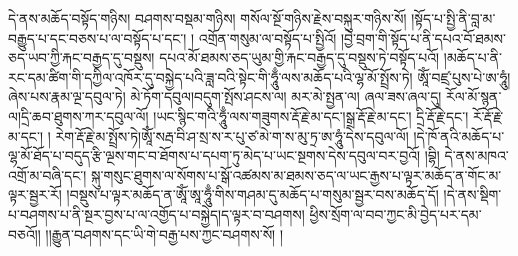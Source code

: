 དེ་ནས་མཆོད་བསྟོད་གཉིས། བཤགས་བསྡམ་གཉིས། གསོལ་སྔོ་གཉིས་རྗེས་བསྐུར་གཉིས་སོ། །སྟོད་པ་སྤྱི་ནི་བླ་མ་བརྒྱུད་པ་དང་བཅས་པ་ལ་བསྟོད་པ་དང་། ། འགྲོན་གསུམ་ལ་བསྟོད་པ་སྤྱིའོ། །བྱེ་བྲག་གི་སྟོད་པ་ནི་དཔའ་བོ་ཐམས་ཅད་ཡབ་ཀྱི་རྐང་བརྒྱད་དུ་བསྡུས། དཔའ་མོ་ཐམས་ཅད་ཡུམ་གྱི་རྐང་བརྒྱད་དུ་བསྡུས་ཏེ་བསྟོད་པའོ། །མཆོད་པ་ནི་རང་དམ་ཚིག་གི་དཀྱིལ་འཁོར་དུ་བསྐྱེད་པའི་ཟླ་བའི་སྟེང་གི་ཧཱུྃ་ལས་མཆོད་པའི་ལྷ་མོ་སྤྲོས་ཏེ། ཨཱོཾ་བཛྲ་པུས་པེ་ཨ་ཧཱུཾ། ཞེས་པས་རྣམ་ལྔ་དབུལ་ཏེ། མེ་ཏོག་དབུལ།བདུག་སྤོས་ཤངས་ལ། མར་མེ་སྤྱན་ལ། ཞལ་ཟས་ཞལ་དུ། རོལ་མོ་སྙན་ལ།དྲི་ཆབ་ཐུགས་ཀར་དབུལ་ལོ། །ཡང་སྙིང་གའི་ཧཱུྃ་ལས་གཟུགས་རྡོ་རྗེ་མ་དང་།སྒྲ་རྡོ་རྗེ་མ་དང་། དྲི་རྡོ་རྗེ་དང་། རོ་རྡོ་རྗེ་མ་དང་། ། རེག་རྡོ་རྗེ་མ་སྤྲོས་ཏེ།ཨཱོཾ་སརྦ་བི་ཤ་སྲ་ས་ར་པུ་ཙ་མེ་ག་ས་མུ་ཏྲ་ཨ་ཧཱུཾ་དེས་དབུལ་ལོ། །དེ་ཁོ་ནའི་མཆོད་པ་ལྷ་མོ་ཐོད་པ་བདུད་རྩི་ལྔས་གང་བ་ཐོགས་པ་དཔག་ཏུ་མེད་པ་ཡང་སྔགས་དེས་དབུལ་བར་བྱའོ། །བྷི། དེ་ནས་མཁའ་འགྲོ་མ་བཞི་དང་། སྐུ་གསུང་ཐུགས་ལ་སོགས་པ་སྒོ་འཚམས་མ་ཐམས་ཅད་ལ་ཡང་རྒྱས་པ་ལྟར་མཆོད་ན་གོང་མ་ལྟར་སྦྱར་རོ། །བསྡུས་པ་ལྟར་མཆོད་ན་ཨཱོཾ་ཨཱ་ཧཱུྃ་གིས་གཤམ་དུ་མཆོད་པ་གསུམ་སྦྱར་བས་མཆོད་དོ། །དེ་ནས་སྡིག་པ་བཤགས་པ་ནི་སྔར་བྱས་པ་ལ་འགྱོད་པ་བསྐྱེད།ད་ལྟར་བ་བཤགས། ཕྱིས་སྲོག་ལ་བབ་ཀྱང་མི་བྱེད་པར་དམ་བཅའོ།། །།རྒྱུན་བཤགས་དང་ཡི་གེ་བརྒྱ་པས་ཀྱང་བཤགས་སོ། །
